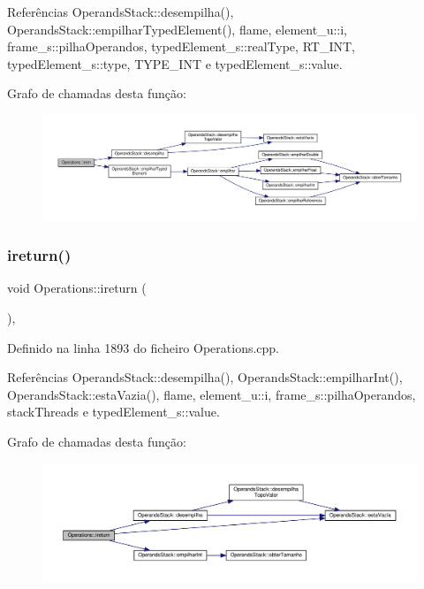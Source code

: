 Referências Operands\+Stack\+::desempilha(), Operands\+Stack\+::empilhar\+Typed\+Element(), flame, element\+\_\+u\+::i, frame\+\_\+s\+::pilha\+Operandos, typed\+Element\+\_\+s\+::real\+Type, R\+T\+\_\+\+I\+NT, typed\+Element\+\_\+s\+::type, T\+Y\+P\+E\+\_\+\+I\+NT e typed\+Element\+\_\+s\+::value.

Grafo de chamadas desta função\+:
\nopagebreak
\begin{figure}[H]
\begin{center}
\leavevmode
\includegraphics[width=350pt]{classOperations_a510bd2d155695861597a4413b44565bc_cgraph}
\end{center}
\end{figure}
\mbox{\label{classOperations_a4be12fb7c8eeee8a2f6489ec27a46dce}} 
\subsubsection{\texorpdfstring{ireturn()}{ireturn()}}
{\footnotesize\ttfamily void Operations\+::ireturn (\begin{DoxyParamCaption}{ }\end{DoxyParamCaption})\hspace{0.3cm}{\ttfamily [static]}, {\ttfamily [private]}}



Definido na linha 1893 do ficheiro Operations.\+cpp.



Referências Operands\+Stack\+::desempilha(), Operands\+Stack\+::empilhar\+Int(), Operands\+Stack\+::esta\+Vazia(), flame, element\+\_\+u\+::i, frame\+\_\+s\+::pilha\+Operandos, stack\+Threads e typed\+Element\+\_\+s\+::value.

Grafo de chamadas desta função\+:
\nopagebreak
\begin{figure}[H]
\begin{center}
\leavevmode
\includegraphics[width=350pt]{classOperations_a4be12fb7c8eeee8a2f6489ec27a46dce_cgraph}
\end{center}
\end{figure}
\mbox{\label{classOperations_a3139bbe41519fb4761ecd7e2a8ddb994}} 
